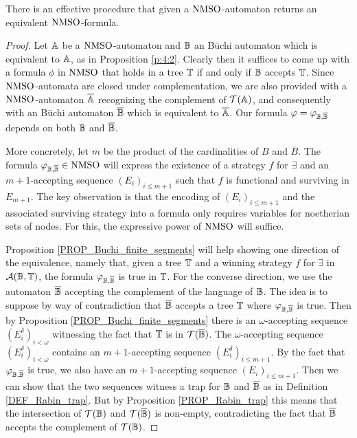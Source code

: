 \newcommand{\ThWeakAutToWFMSO}{
There is an effective procedure that given a $\nmso$-automaton returns an equivalent $\nmso$-formula.
}
\begin{theorem}\label{thm:nmso_autofor}
\ThWeakAutToWFMSO
\end{theorem}
\begin{proof}
Let $\mathbb{A}$ be a $\mathrm{NMSO}$-automaton and $\mathbb{B}$ an
B\"{u}chi automaton which is equivalent to $\mathbb{A}$, as in
Proposition \ref{p:4:2}.
Clearly then it suffices to come up with a formula $\phi$ in $\mathrm{NMSO}$ that
holds in a tree $\mathbb{T}$ if and only if $\mathbb{B}$ accepts $\mathbb{T}$.
Since $\mathrm{NMSO}$-automata are closed under complementation, we are also
provided with a $\mathrm{NMSO}$-automaton $\overline{\mathbb{A}}$ recognizing
the complement of $\mathcal{T}(\mathbb{A})$, and consequently with an
B\"{u}chi automaton $\overline{\mathbb{B}}$ which is equivalent to
$\overline{\mathbb{A}}$.
Our formula $\varphi = \varphi_{\mathbb{B},\overline{\mathbb{B}}}$ depends on
both $\mathbb{B}$ and $\overline{\mathbb{B}}$.


More concretely, let $m$ be the product of the cardinalities of $B$ and
$\overline{B}$.
The formula $\varphi_{\mathbb{B},\overline{\mathbb{B}}} \in
\mathrm{NMSO}$ will express the existence of a strategy $f$ for $\exists$ and an
$m+1$-accepting sequence $(E_i)_{i \leq {m+1}}$ such that $f$ is functional and
surviving in $E_{m+1}$.
The key observation is that the encoding of $(E_i)_{i \leq {m+1}}$ and the associated surviving strategy into a formula only
requires variables for noetherian sets of nodes.
For this, the expressive power of $\mathrm{NMSO}$ will suffice.

Proposition \ref{PROP_Buchi_finite_segments} will help showing one direction of
the equivalence, namely that, given a tree $\mathbb{T}$ and a winning strategy $f$
for $\exists$ in $\mathcal{A}(\mathbb{B},\mathbb{T})$, the formula
$\varphi_{\mathbb{B},\overline{\mathbb{B}}}$ is true in $\mathbb{T}$.
%
For the converse direction, we use the automaton $\overline{\mathbb{B}}$
accepting the complement of the language of $\mathbb{B}$. The idea is to
suppose by way of contradiction that $\overline{\mathbb{B}}$ accepts a tree
$\mathbb{T}$ where $\varphi_{\mathbb{B},\overline{\mathbb{B}}}$ is true.
Then by Proposition \ref{PROP_Buchi_finite_segments} there is an
$\omega$-accepting sequence $(E^{\delta}_i)_{i < \omega}$ witnessing the fact
that $\mathbb{T}$ is in $\mathcal{T}(\overline{\mathbb{B}})$.
The $\omega$-accepting sequence $(E^{\delta}_i)_{i < \omega}$ contains an
$m+1$-accepting sequence $(E^{\delta}_i)_{i \leq {m+1}}$. By the fact that
$\varphi_{\mathbb{B},\overline{\mathbb{B}}}$ is true, we also have an $m+1$-accepting
sequence $(E_i)_{i \leq {m+1}}$. Then we can show that the two sequences witness
a trap for $\mathbb{B}$ and $\overline{\mathbb{B}}$ as in Definition
\ref{DEF_Rabin_trap}. But by Proposition \ref{PROP_Rabin_trap} this means
that the intersection of $\mathcal{T}(\mathbb{B})$ and
$\mathcal{T}(\overline{\mathbb{B}})$ is non-empty, contradicting the fact
that $\overline{\mathbb{B}}$ accepts the complement of $\mathcal{T}(\mathbb{B})$.



\end{proof}
